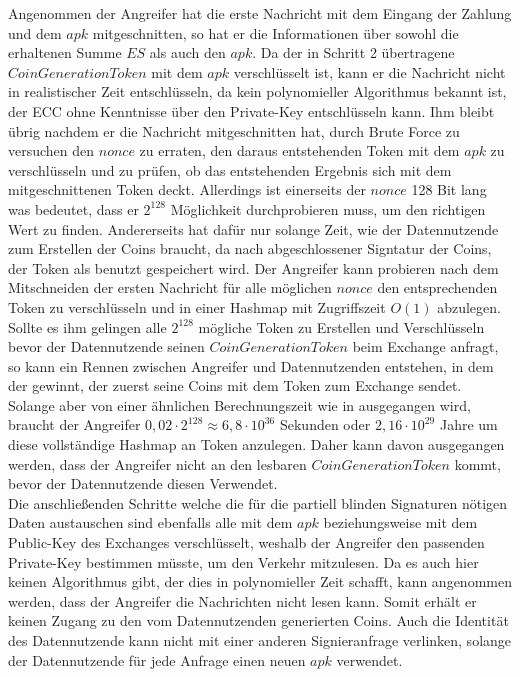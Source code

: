 \documentclass[
	fontsize=12pt,
	headings=small,
	parskip=half,           %
	bibliography=totoc,
	numbers=noenddot,       %
	open=any,               %
]{scrreprt}
\begin{document}
Angenommen der Angreifer hat die erste Nachricht mit dem Eingang der Zahlung und dem $apk$ mitgeschnitten, so hat er die Informationen über sowohl die erhaltenen Summe $ES$ als auch den $apk$. Da der in Schritt 2 übertragene $CoinGenerationToken$ mit dem $apk$ verschlüsselt ist, kann er die Nachricht nicht in realistischer Zeit entschlüsseln, da kein polynomieller Algorithmus bekannt ist, der ECC ohne Kenntnisse über den Private-Key entschlüsseln kann. Ihm bleibt übrig nachdem er die Nachricht mitgeschnitten hat, durch Brute Force zu versuchen den $nonce$ zu erraten, den daraus entstehenden Token mit dem $apk$ zu verschlüsseln und zu prüfen, ob das entstehenden Ergebnis sich mit dem mitgeschnittenen Token deckt. Allerdings ist einerseits der $nonce$ 128 Bit lang was bedeutet, dass er $2^{128}$ Möglichkeit durchprobieren muss, um den richtigen Wert zu finden. Andererseits hat dafür nur solange Zeit, wie der Datennutzende zum Erstellen der Coins braucht, da nach abgeschlossener Signtatur der Coins, der Token als benutzt gespeichert wird. Der Angreifer kann probieren nach dem Mitschneiden der ersten Nachricht für alle möglichen $nonce$ den entsprechenden Token zu verschlüsseln und in einer Hashmap mit Zugriffszeit $O(1)$ abzulegen. Sollte es ihm gelingen alle $2^{128}$ mögliche Token zu Erstellen und Verschlüsseln bevor der Datennutzende seinen $CoinGenerationToken$ beim Exchange anfragt, so kann ein Rennen zwischen Angreifer und Datennutzenden entstehen, in dem der gewinnt, der zuerst seine Coins mit dem Token zum Exchange sendet. Solange aber von einer ähnlichen Berechnungszeit wie in \cite{nofriansyah2018efficiency} ausgegangen wird, braucht der Angreifer $0,02 \cdot 2^{128}\approx 6,8\cdot10^{36}$ Sekunden oder $2,16\cdot10^{29}$ Jahre um diese vollständige Hashmap an Token anzulegen. Daher kann davon ausgegangen werden, dass der Angreifer nicht an den lesbaren $CoinGenerationToken$ kommt, bevor der Datennutzende diesen Verwendet.\\

Die anschließenden Schritte welche die für die partiell blinden Signaturen nötigen Daten austauschen sind ebenfalls alle mit dem $apk$ beziehungsweise mit dem Public-Key des Exchanges verschlüsselt, weshalb der Angreifer den passenden Private-Key bestimmen müsste, um den Verkehr mitzulesen. Da es auch hier keinen Algorithmus gibt, der dies in polynomieller Zeit schafft, kann angenommen werden, dass der Angreifer die Nachrichten nicht lesen kann. Somit erhält er keinen Zugang zu den vom Datennutzenden generierten Coins. Auch die Identität des Datennutzende kann nicht mit einer anderen Signieranfrage verlinken, solange der Datennutzende für jede Anfrage einen neuen $apk$ verwendet.
\end{document}
